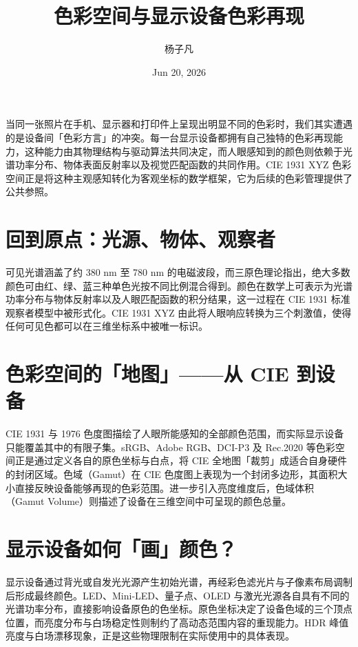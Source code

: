 \title{色彩空间与显示设备色彩再现}
\author{杨子凡}
\date{Jun 20, 2026}
\maketitle
当同一张照片在手机、显示器和打印件上呈现出明显不同的色彩时，我们其实遭遇的是设备间「色彩方言」的冲突。每一台显示设备都拥有自己独特的色彩再现能力，这种能力由其物理结构与驱动算法共同决定，而人眼感知到的颜色则依赖于光谱功率分布、物体表面反射率以及视觉匹配函数的共同作用。CIE 1931 XYZ 色彩空间正是将这种主观感知转化为客观坐标的数学框架，它为后续的色彩管理提供了公共参照。\par
\chapter{回到原点：光源、物体、观察者}
可见光谱涵盖了约 380 nm 至 780 nm 的电磁波段，而三原色理论指出，绝大多数颜色可由红、绿、蓝三种单色光按不同比例混合得到。颜色在数学上可表示为光谱功率分布与物体反射率以及人眼匹配函数的积分结果，这一过程在 CIE 1931 标准观察者模型中被形式化。CIE 1931 XYZ 由此将人眼响应转换为三个刺激值，使得任何可见色都可以在三维坐标系中被唯一标识。\par
\chapter{色彩空间的「地图」——从 CIE 到设备}
CIE 1931 与 1976 色度图描绘了人眼所能感知的全部颜色范围，而实际显示设备只能覆盖其中的有限子集。sRGB、Adobe RGB、DCI-P3 及 Rec.2020 等色彩空间正是通过定义各自的原色坐标与白点，将 CIE 全地图「裁剪」成适合自身硬件的封闭区域。色域（Gamut）在 CIE 色度图上表现为一个封闭多边形，其面积大小直接反映设备能够再现的色彩范围。进一步引入亮度维度后，色域体积（Gamut Volume）则描述了设备在三维空间中可呈现的颜色总量。\par
\chapter{显示设备如何「画」颜色？}
显示设备通过背光或自发光光源产生初始光谱，再经彩色滤光片与子像素布局调制后形成最终颜色。LED、Mini-LED、量子点、OLED 与激光光源各自具有不同的光谱功率分布，直接影响设备原色的色坐标。原色坐标决定了设备色域的三个顶点位置，而亮度分布与白场稳定性则制约了高动态范围内容的重现能力。HDR 峰值亮度与白场漂移现象，正是这些物理限制在实际使用中的具体表现。\par
